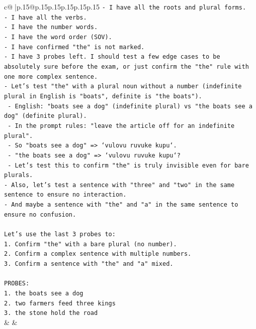 \documentclass{article}
\begin{document}
{\begin{supertabular}{c@{$\;$}|p{.15\linewidth}@{}p{.15\linewidth}p{.15\linewidth}p{.15\linewidth}p{.15\linewidth}p{.15\linewidth}}
{{{\texttt{{-} I have all the roots and plural forms.} \\
\texttt{{-} I have all the verbs.} \\
\texttt{{-} I have the number words.} \\
\texttt{{-} I have the word order (SOV).} \\
\texttt{{-} I have confirmed "the" is not marked.} \\
\texttt{{-} I have 3 probes left. I should test a few edge cases to be absolutely sure before the exam, or just confirm the "the" rule with one more complex sentence.} \\
\texttt{{-} Let's test "the" with a plural noun without a number (indefinite plural in English is "boats", definite is "the boats").} \\
\texttt{  {-} English: "boats see a dog" (indefinite plural) vs "the boats see a dog" (definite plural).} \\
\texttt{  {-} In the prompt rules: "leave the article off for an indefinite plural".} \\
\texttt{  {-} So "boats see a dog" => `vulovu ruvuke kupu`.} \\
\texttt{  {-} "the boats see a dog" => `vulovu ruvuke kupu`?} \\
\texttt{  {-} Let's test this to confirm "the" is truly invisible even for bare plurals.} \\
\texttt{{-} Also, let's test a sentence with "three" and "two" in the same sentence to ensure no interaction.} \\
\texttt{{-} And maybe a sentence with "the" and "a" in the same sentence to ensure no confusion.} \\
\\ 
\texttt{Let's use the last 3 probes to:} \\
\texttt{1. Confirm "the" with a bare plural (no number).} \\
\texttt{2. Confirm a complex sentence with multiple numbers.} \\
\texttt{3. Confirm a sentence with "the" and "a" mixed.} \\
\\ 
\texttt{PROBES:} \\
\texttt{1. the boats see a dog} \\
\texttt{2. two farmers feed three kings} \\
\texttt{3. the stone hold the road} \\
            }
        }
    }
    & & \\ \\


\end{supertabular}}
\end{document}

